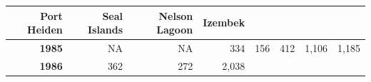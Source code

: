 \documentclass[]{article}
\begin{document}
\begin{longtable}[]{@{}rrrrrrrr@{}}
\begin{minipage}[b]{0.14\columnwidth}
\textbf{Port Heiden}\strut
\end{minipage} & \begin{minipage}[b]{0.09\columnwidth}\raggedleft\strut
\textbf{Seal Islands}\strut
\end{minipage} & \begin{minipage}[b]{0.08\columnwidth}\raggedleft\strut
\textbf{Nelson Lagoon}\strut
\end{minipage} & \begin{minipage}[b]{0.10\columnwidth}\raggedleft\strut
\textbf{Izembek}\strut
\end{minipage}\tabularnewline
\midrule
\endhead
\begin{minipage}[t]{0.08\columnwidth}\raggedleft\strut
\textbf{1985}\strut
\end{minipage} & \begin{minipage}[t]{0.10\columnwidth}\raggedleft\strut
NA\strut
\end{minipage} & \begin{minipage}[t]{0.11\columnwidth}\raggedleft\strut
NA\strut
\end{minipage} & \begin{minipage}[t]{0.08\columnwidth}\raggedleft\strut
334\strut
\end{minipage} & \begin{minipage}[t]{0.14\columnwidth}\raggedleft\strut
156\strut
\end{minipage} & \begin{minipage}[t]{0.09\columnwidth}\raggedleft\strut
412\strut
\end{minipage} & \begin{minipage}[t]{0.08\columnwidth}\raggedleft\strut
1,106\strut
\end{minipage} & \begin{minipage}[t]{0.10\columnwidth}\raggedleft\strut
1,185\strut
\end{minipage}\tabularnewline
\begin{minipage}[t]{0.08\columnwidth}\raggedleft\strut
\textbf{1986}\strut
\end{minipage} & \begin{minipage}[t]{0.10\columnwidth}\raggedleft\strut
362\strut
\end{minipage} & \begin{minipage}[t]{0.11\columnwidth}\raggedleft\strut
272\strut
\end{minipage} & \begin{minipage}[t]{0.08\columnwidth}\raggedleft\strut
2,038\strut
\end{minipage} & \begin{minipage}[t]{0.14\columnwidth}\raggedleft\strut

\end{minipage}
\end{longtable}
\end{document}
